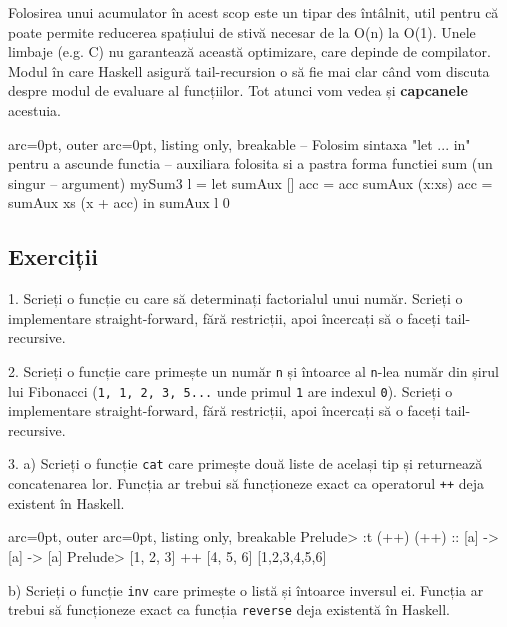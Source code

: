 \begin{tcolorbox}[colback=yellow!40, colframe=yellow!60, breakable]
Folosirea unui acumulator în acest scop este un tipar des întâlnit, util pentru că poate permite reducerea spațiului de stivă necesar de la O(n) la O(1). Unele limbaje (e.g. C) nu garantează această optimizare, care depinde de compilator.\\
Modul în care Haskell asigură tail-recursion o să fie mai clar când vom discuta despre modul de evaluare al funcțiilor. Tot atunci vom vedea și \textbf{capcanele} acestuia.
\end{tcolorbox}



\begin{tcblisting}{ arc=0pt, outer arc=0pt, listing only, breakable}
-- Folosim sintaxa "let ... in" pentru a ascunde functia
-- auxiliara folosita si a pastra forma functiei sum (un singur
-- argument)
mySum3 l = let
           sumAux [] acc = acc
           sumAux (x:xs) acc = sumAux xs (x + acc)
           in
           sumAux l 0

\end{tcblisting}


\subsection*{ Exerciții }

1. Scrieți o funcție cu care să determinați factorialul unui număr. Scrieți o implementare straight-forward, fără restricții, apoi încercați să o faceți tail-recursive.


2. Scrieți o funcție care primește un număr \texttt{n} și întoarce al \texttt{n}-lea număr din șirul lui Fibonacci (\texttt{1, 1, 2, 3, 5...} unde primul \texttt{1} are indexul \texttt{0}). Scrieți o implementare straight-forward, fără restricții, apoi încercați să o faceți tail-recursive.


3. a) Scrieți o funcție \texttt{cat} care primește două liste de același tip și returnează concatenarea lor. Funcția ar trebui să funcționeze exact ca operatorul \texttt{++} deja existent în Haskell.


\begin{tcblisting}{ arc=0pt, outer arc=0pt, listing only, breakable}
Prelude> :t (++)
(++) :: [a] -> [a] -> [a]
Prelude> [1, 2, 3] ++ [4, 5, 6]
[1,2,3,4,5,6]

\end{tcblisting}


b) Scrieți o funcție \texttt{inv} care primește o listă și întoarce inversul ei. Funcția ar trebui să funcționeze exact ca funcția \texttt{reverse} deja existentă în Haskell.


